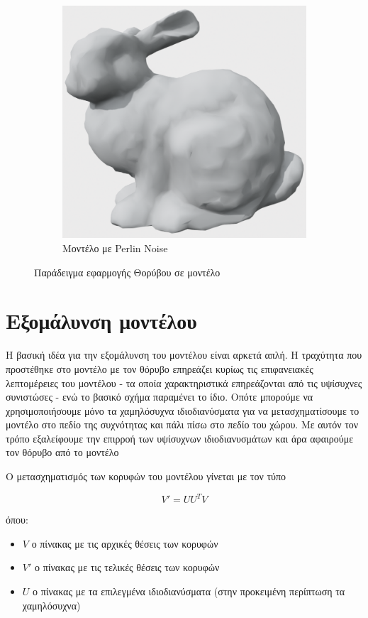 \documentclass[draft]{article}
\begin{document}
\begin{figure}[h]
	\begin{subfigure}{0.5\textwidth}
		\includegraphics[width=0.9\linewidth]{"perlin_noise.png"}
		\caption{Μοντέλο με Perlin Noise}
	\end{subfigure}
	\caption{Παράδειγμα εφαρμογής Θορύβου σε μοντέλο}
\end{figure}

\section{Εξομάλυνση μοντέλου}
Η βασική ιδέα για την εξομάλυνση του μοντέλου είναι αρκετά απλή. Η τραχύτητα που
προστέθηκε στο μοντέλο με τον θόρυβο επηρεάζει κυρίως τις επιφανειακές λεπτομέρειες
του μοντέλου - τα οποία χαρακτηριστικά επηρεάζονται από τις υψίσυχνες συνιστώσες -
ενώ το βασικό σχήμα παραμένει το ίδιο. Οπότε μπορούμε να χρησιμοποιήσουμε μόνο τα
χαμηλόσυχνα ιδιοδιανύσματα για να μετασχηματίσουμε το μοντέλο στο πεδίο της συχνότητας και
πάλι πίσω στο πεδίο του χώρου. Με αυτόν τον τρόπο εξαλείφουμε την επιρροή των υψίσυχνων
ιδιοδιανυσμάτων και άρα αφαιρούμε τον θόρυβο από το μοντέλο

Ο μετασχηματισμός των κορυφών του μοντέλου γίνεται με τον τύπο

\[
	V' = UU^TV
\]

όπου:
\begin{itemize}
	\item $V$ ο πίνακας με τις αρχικές θέσεις των κορυφών
	\item $V'$ ο πίνακας με τις τελικές θέσεις των κορυφών
	\item $U$ ο πίνακας με τα επιλεγμένα ιδιοδιανύσματα
		(στην προκειμένη περίπτωση τα χαμηλόσυχνα)
\end{itemize}
\end{document}
